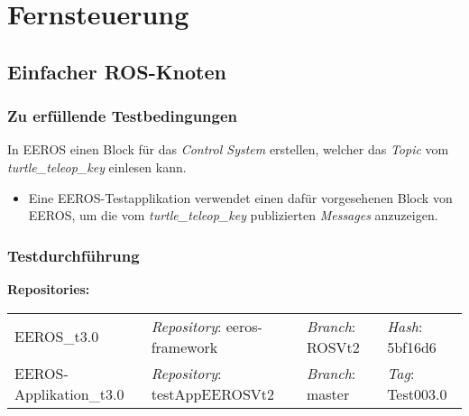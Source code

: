 \section{Fernsteuerung}
\subsection{Einfacher ROS-Knoten}
\subsubsection{Zu erfüllende Testbedingungen}
In EEROS einen Block für das \textit{Control System} erstellen, welcher das \textit{Topic} vom \textit{turtle\_teleop\_key} einlesen kann.
\begin{itemize}
\item Eine EEROS-Testapplikation verwendet einen dafür vorgesehenen Block von EEROS, um die vom \textit{turtle\_teleop\_key} publizierten \textit{Messages} anzuzeigen.
\end{itemize}

\subsubsection{Testdurchführung}
\textbf{Repositories:} \\
\begin{tabular}
  { l						| l			 							l								 l								}

  EEROS\_t3.0				& \textit{Repository}: eeros-framework	& \textit{Branch}: ROSVt2		& \textit{Hash}: 5bf16d6		\\
  EEROS-Applikation\_t3.0	& \textit{Repository}: testAppEEROSVt2	& \textit{Branch}: master		& \textit{Tag}: Test003.0		\\
\end{tabular}

